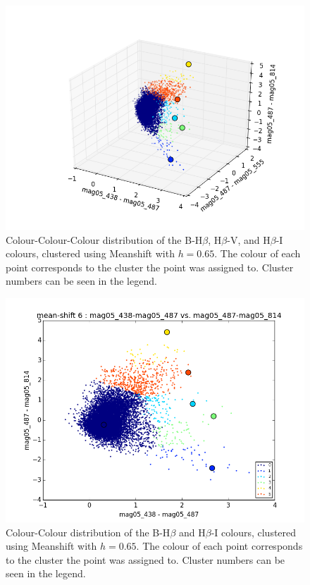\begin{figure}
\centering
\includegraphics[width=\linewidth]{figs/meanshift_3d_color_6cl_mag05_438-mag05_487vsmag05_487-mag05_555vsmag05_487-mag05_814}
\caption{Colour-Colour-Colour distribution of the B-H$\beta$, H$\beta$-V, and H$\beta$-I colours, clustered using Meanshift with $h=0.65$. The colour of each point corresponds to the cluster the point was assigned to. Cluster numbers can be seen in the legend.}
\label{fig:HB3dMS1}
\end{figure}

\begin{figure}
\centering
\includegraphics[width=\linewidth]{figs/meanshift_3d_color_6cl_mag05_438-mag05_487vsmag05_487-mag05_814}
\caption{Colour-Colour distribution of the B-H$\beta$ and H$\beta$-I colours, clustered using Meanshift with $h=0.65$. The colour of each point corresponds to the cluster the point was assigned to. Cluster numbers can be seen in the legend.}
\label{fig:HB3dMS2}
\end{figure}

